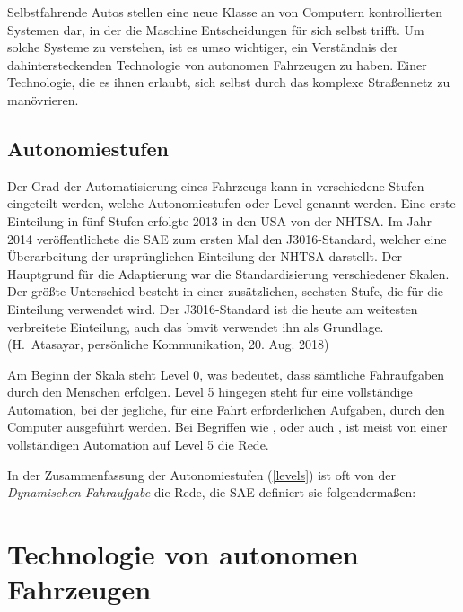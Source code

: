 Selbstfahrende Autos stellen eine neue Klasse an von Computern kontrollierten Systemen dar, in der die Maschine Entscheidungen für sich selbst trifft. Um solche Systeme zu verstehen, ist es umso wichtiger, ein Verständnis der dahintersteckenden Technologie von autonomen Fahrzeugen zu haben. Einer Technologie, die es ihnen erlaubt, sich selbst durch das komplexe Straßennetz zu manövrieren.

\subsection{Autonomiestufen}
Der Grad der Automatisierung eines Fahrzeugs kann in verschiedene Stufen eingeteilt werden, welche Autonomiestufen oder Level genannt werden. Eine erste Einteilung in fünf Stufen erfolgte 2013 in den USA von der \ac{NHTSA}. Im Jahr 2014 veröffentlichete die \ac{SAE} zum ersten Mal den J3016-Standard, welcher eine Überarbeitung der ursprünglichen Einteilung der \ac{NHTSA} darstellt. Der Hauptgrund für die Adaptierung war die Standardisierung verschiedener Skalen. Der größte Unterschied besteht in einer zusätzlichen, sechsten Stufe, die für die Einteilung verwendet wird.  Der J3016-Standard ist die heute am weitesten verbreitete Einteilung, auch das \ac{bmvit} verwendet ihn als Grundlage. (H.~Atasayar, persönliche Kommunikation, 20. Aug. 2018)

Am Beginn der Skala steht Level 0, was bedeutet, dass sämtliche Fahraufgaben durch den Menschen erfolgen. Level 5 hingegen steht für eine vollständige Automation, bei der jegliche, für eine Fahrt erforderlichen Aufgaben, durch den Computer ausgeführt werden. Bei Begriffen wie ,  oder auch , ist meist von einer vollständigen Automation auf Level 5 die Rede.

In der Zusammenfassung der Autonomiestufen (\ref{levels}) ist oft von der \textit{Dynamischen Fahraufgabe} die Rede, die \ac{SAE} definiert sie folgendermaßen: 

\nocite{wiki-levels}



\section{Technologie von autonomen Fahrzeugen}

